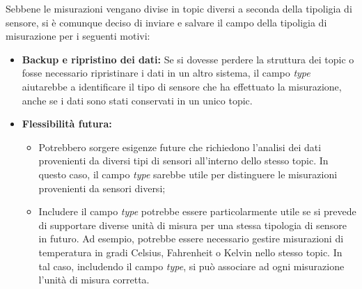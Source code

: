 Sebbene le misurazioni vengano divise in topic diversi a seconda della tipoligia di sensore, si è comunque deciso di inviare e salvare il campo della tipoligia di misurazione per i seguenti motivi:
\begin{itemize}
    \item \textbf{Backup e ripristino dei dati:} Se si dovesse perdere la struttura dei topic o fosse necessario ripristinare i dati in un altro sistema, il campo \textit{type} aiutarebbe a identificare il tipo di sensore che ha effettuato la misurazione, anche se i dati sono stati conservati in un unico topic.
    \item \textbf{Flessibilità futura:} 
    \begin{itemize}
        \item Potrebbero sorgere esigenze future che richiedono l'analisi dei dati provenienti da diversi tipi di sensori all'interno dello stesso topic. In questo caso, il campo \textit{type} sarebbe utile per distinguere le misurazioni provenienti da sensori diversi;
        \item Includere il campo \textit{type} potrebbe essere particolarmente utile se si prevede di supportare diverse unità di misura per una stessa tipologia di sensore in futuro. Ad esempio, potrebbe essere necessario gestire misurazioni di temperatura in gradi Celsius, Fahrenheit o Kelvin nello stesso topic. In tal caso, includendo il campo \textit{type}, si può associare ad ogni misurazione l'unità di misura corretta.
    \end{itemize}
\end{itemize}
